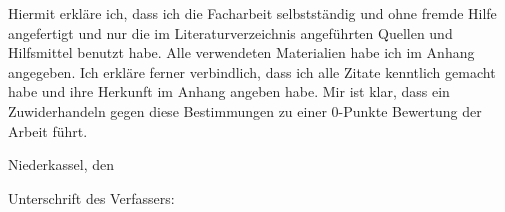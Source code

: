 
Hiermit erkläre ich, dass ich die Facharbeit selbstständig und ohne fremde Hilfe
angefertigt und nur die im Literaturverzeichnis angeführten Quellen und Hilfsmittel
benutzt habe.
Alle verwendeten Materialien habe ich im Anhang angegeben.
Ich erkläre ferner verbindlich, dass ich alle Zitate kenntlich gemacht habe
und ihre Herkunft im Anhang angeben habe.
Mir ist klar, dass ein Zuwiderhandeln gegen diese Bestimmungen zu einer
0-Punkte Bewertung der Arbeit führt.

\bigskip
\noindent
Niederkassel, den \hfill\underline{\hspace{4cm}}

\medskip
\noindent
Unterschrift des Verfassers: \hfill\underline{\hspace{4cm}}